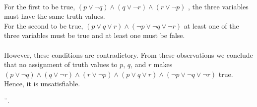 \begin{tcolorbox}[title=Example 1: Satisfiable compound propositions]
\\ For the first to be true, $(p\lor \neg q) \land (q \lor \neg r) \land (r \lor \neg p)$ ,  the three variables must have the same truth values. \\
For the second to be true, $(p \lor q \lor r) \land (\neg p \lor \neg q \lor \neg r)$ at least one of the three variables must be true and at least one must be
false. \\ \\
However, these conditions are contradictory. From these observations we conclude
that no assignment of truth values to $p$, $q$, and $r$ makes $(p\lor \neg q) \land (q \lor \neg r) \land (r \lor \neg p) \land (p \lor q \lor r) \land (\neg p \lor \neg q \lor \neg r)$ true. Hence, it is unsatisfiable.
\end{tcolorbox}










¨.